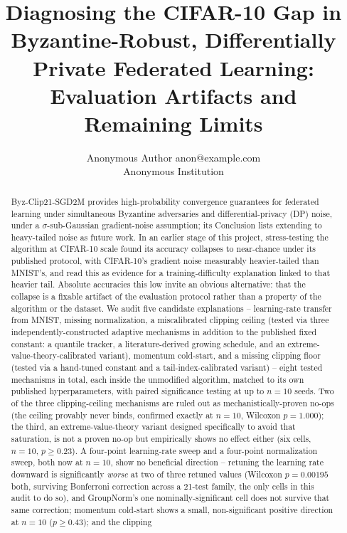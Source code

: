 \documentclass{article}
\title{Diagnosing the CIFAR-10 Gap in Byzantine-Robust, Differentially Private Federated Learning: Evaluation Artifacts and Remaining Limits}
\author{\name Anonymous Author \email anon@example.com \\
        \addr Anonymous Institution}
\begin{document}
\maketitle

\begin{abstract}
Byz-Clip21-SGD2M \citep{islamov2026byzclip} provides high-probability convergence
guarantees for federated learning under simultaneous Byzantine adversaries and
differential-privacy (DP) noise, under a $\sigma$-sub-Gaussian gradient-noise
assumption; its Conclusion lists extending to heavy-tailed noise as future work. In
an earlier stage of this project, stress-testing the algorithm at CIFAR-10 scale
found its accuracy collapses to near-chance under its published protocol, with
CIFAR-10's gradient noise measurably heavier-tailed than MNIST's, and read this as
evidence for a training-difficulty explanation linked to that heavier tail.
Absolute accuracies this low invite an
obvious alternative: that the collapse is a fixable artifact of the evaluation
protocol rather than a property of the algorithm or the dataset. We audit five
candidate explanations -- learning-rate transfer from MNIST, missing
normalization, a miscalibrated clipping ceiling (tested via three
independently-constructed adaptive mechanisms in addition to the published
fixed constant: a quantile tracker, a literature-derived growing schedule, and
an extreme-value-theory-calibrated variant), momentum cold-start, and a missing
clipping floor (tested via a hand-tuned constant and a tail-index-calibrated
variant) -- eight tested mechanisms in total, each inside the unmodified
algorithm, matched to its own published hyperparameters, with paired
significance testing at up to $n{=}10$ seeds. Two of the three clipping-ceiling
mechanisms are ruled out as mechanistically-proven no-ops (the ceiling provably
never binds, confirmed exactly at $n{=}10$, Wilcoxon $p{=}1.000$); the third, an
extreme-value-theory variant designed specifically to avoid that saturation, is
not a proven no-op but empirically shows no effect either (six cells, $n{=}10$,
$p \geq 0.23$). A
four-point learning-rate sweep and a four-point normalization sweep, both now
at $n{=}10$, show no beneficial direction -- retuning the learning rate downward
is significantly \emph{worse} at two of three retuned values (Wilcoxon
$p{=}0.00195$ both, surviving Bonferroni correction across a 21-test family,
the only cells in this audit to do so), and GroupNorm's one nominally-significant
cell does not survive that same correction; momentum cold-start shows a small,
non-significant positive direction at $n{=}10$ ($p \geq 0.43$); and the clipping

\end{abstract}
\end{document}
